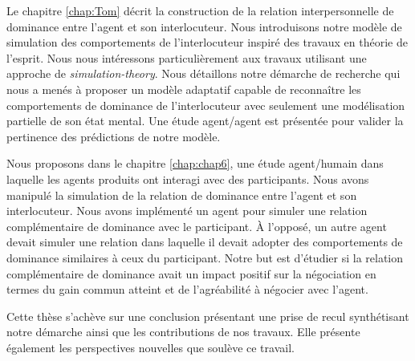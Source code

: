 Le chapitre \ref{chap:Tom} décrit la construction de la relation interpersonnelle de dominance entre l'agent et son interlocuteur. 
Nous introduisons notre modèle de simulation des comportements de l'interlocuteur inspiré des travaux en théorie de l'esprit. Nous nous intéressons particulièrement aux travaux utilisant une approche de \emph{simulation-theory}.
Nous détaillons notre démarche de recherche qui nous a menés à proposer un modèle adaptatif capable de reconnaître les comportements de dominance de l'interlocuteur avec seulement une modélisation partielle de son état mental.
Une étude agent/agent est présentée pour valider la pertinence des prédictions de notre modèle. 

Nous proposons dans le chapitre \ref{chap:chap6}, une étude agent/humain dans laquelle les agents produits ont interagi avec des participants. Nous avons manipulé la simulation de la relation de dominance entre l'agent et son interlocuteur. Nous avons implémenté un agent pour simuler une relation complémentaire de dominance avec le participant. À l'opposé, un autre agent devait simuler une relation dans laquelle il devait adopter des comportements de dominance similaires à ceux du participant. Notre but est d'étudier si la relation complémentaire de dominance avait un impact positif sur la négociation en termes du gain commun atteint et de l'agréabilité à négocier avec l'agent. 

Cette thèse s'achève sur une conclusion présentant une prise de recul synthétisant notre démarche ainsi que les contributions de nos travaux. Elle présente également les perspectives nouvelles que soulève ce travail.